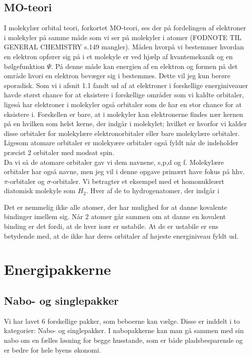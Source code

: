 \documentclass[12pt,a4paper]{article}
\theoremstyle{break}
\theoremstyle{nonumberplain}
\begin{document}
\subsection{MO-teori}
I molekylær orbital teori, forkortet MO-teori, ses der på fordelingen af elektroner i molekyler på samme måde som vi ser på molekyler i atomer (FODNOTE TIL GENERAL CHEMISTRY s.149 mangler). Måden hvorpå vi bestemmer hvordan en elektron opfører sig på i et molekyle er ved hjælp af kvantemekanik og en bølgefunktion $\Psi$. På denne måde kan energien af en elektron og formen på det område hvori en elektron bevæger sig i bestemmes. Dette vil jeg kun berøre sporadisk. Som vi i afsnit 1.1 fandt ud af at elektroner i forskellige energiniveauer havde størst chance for at eksistere i forskellige områder som vi kaldte orbitaler, ligeså har elektroner i molekyler også orbitaler som de har en stor chance for at eksistere i. Forskellen er bare, at i molekyler kan elektronerne findes nær kernen på en hvilken som helst kerne, der indgår i molekylet; hvilket er hvorfor vi kalder disse orbitaler for molekylære elektronorbitaler eller bare molekylære orbitaler. 
Ligesom atomare orbitaler er molekyære orbitaler også fyldt når de indeholder præcist 2 orbitaler med modsat spin. 
\\

Da vi så de atomare orbitaler gav vi dem navnene, s,p,d og f. Molekylære orbitaler har også navne, men jeg vil i denne opgave primært have fokus på hhv. $\pi$-orbitaler og $\sigma$-orbitaler. Vi betragter et eksempel med et homonukleært diatomisk molekyle som $H_2$. Hver af de to hydrogenatomer, der indgår i 
\pagebreak



Det er nemmelig ikke alle atomer, der har mulighed for at danne kovalente bindinger imellem sig. Når 2 atomer går sammen om at danne en kovalent binding er det fordi, at de hver især er ustabile. At de er ustabile er ens betydende med, at de ikke har deres orbitaler af højeste energiniveau fyldt ud. 

\section{Energipakkerne}
\subsection{Nabo- og singlepakker}
Vi har lavet 6 forskellige pakker, som beboerne kan vælge. Disse er inddelt i to kategorier: Nabo- og singlepakker.
I nabopakkerne kan man gå sammen med sin nabo om en fælles løsning for begge husstande, som er både pladsbesparende og er bedre for hele byens økonomi. 
\end{document}
